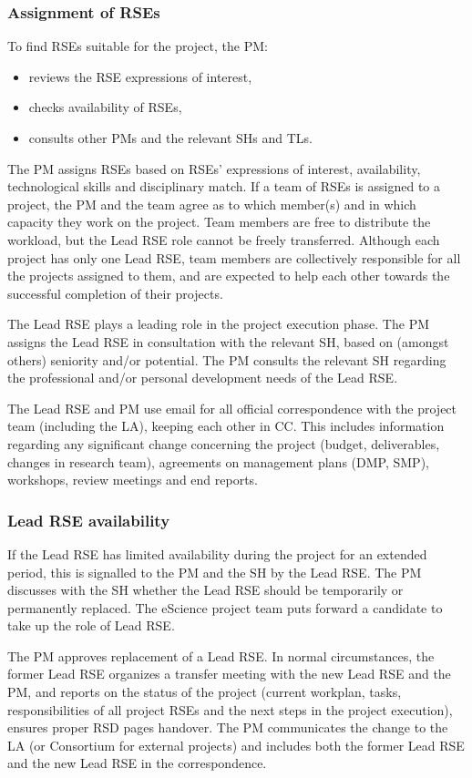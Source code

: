 \documentclass[11pt]{article}
\begin{document}
\subsubsection{Assignment of RSEs}
To find RSEs suitable for the project, the PM:

\begin{itemize}
\item reviews the RSE expressions of interest,
\item checks availability of RSEs,
\item consults other PMs and the relevant SHs and TLs.
\end{itemize}

The PM assigns RSEs based on RSEs' expressions of interest, availability, technological skills and
disciplinary match. If a team of RSEs is assigned to a project, the PM and the team agree as to which member(s) and in
which capacity they work on the project. Team members are free to distribute the workload, but the Lead RSE role cannot
be freely transferred. Although each project has only one Lead RSE, team members are collectively responsible for all
the projects assigned to them, and are expected to help each other towards the successful completion of their
projects.

The Lead RSE plays a leading role in the project execution phase. The PM assigns the Lead RSE in consultation with the
relevant SH, based on (amongst others) seniority and/or potential. The PM consults the relevant SH regarding the
professional and/or personal development needs of the Lead RSE.

The Lead RSE and PM use email for all official correspondence with the project team (including the LA), keeping each
other in CC. This includes information regarding any significant change concerning the project (budget, deliverables,
changes in research team), agreements on management plans (DMP, SMP), workshops, review meetings and end reports.

\subsubsection{Lead RSE availability}
If the Lead RSE has limited availability during the project for an extended period, this is signalled to the PM and the
SH by the Lead RSE. The PM discusses with the SH whether the Lead RSE should be temporarily or permanently replaced.
The eScience project team puts forward a candidate to take up the role of Lead RSE.

The PM approves replacement of a Lead RSE. In normal circumstances, the former Lead RSE organizes a transfer meeting
with the new Lead RSE and the PM, and reports on the status of the project (current workplan, tasks, responsibilities
of all project RSEs and the next steps in the project execution), ensures proper RSD pages handover. The PM
communicates the change to the LA (or Consortium for external projects) and includes both the former Lead RSE and the
new Lead RSE in the correspondence.
\end{document}
